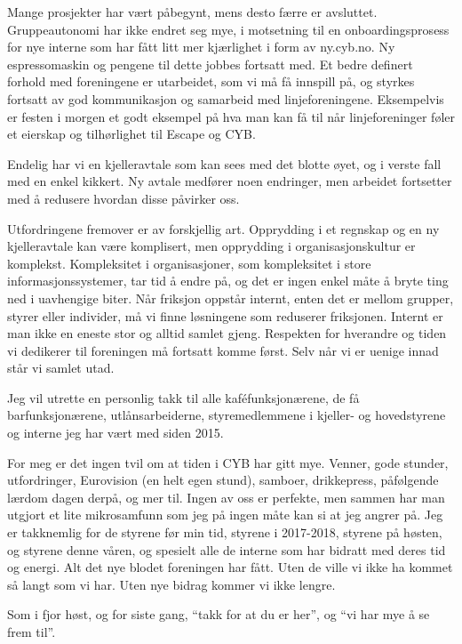 \documentclass[10pt,norsk,a4paper]{article}
\begin{document}
\begin{multicols}{2}
Mange prosjekter har vært påbegynt, mens desto færre er avsluttet.
Gruppeautonomi har ikke endret seg mye, i motsetning til en
onboardingsprosess for nye interne som har fått litt mer kjærlighet i
form av ny.cyb.no. Ny espressomaskin og pengene til dette jobbes
fortsatt med. Et bedre definert forhold med foreningene er utarbeidet,
som vi må få innspill på, og styrkes fortsatt av god kommunikasjon og
samarbeid med linjeforeningene. Eksempelvis er festen i morgen et godt
eksempel på hva man kan få til når linjeforeninger føler et eierskap og
tilhørlighet til Escape og CYB.

Endelig har vi en kjelleravtale som kan sees med det blotte øyet, og i
verste fall med en enkel kikkert. Ny avtale medfører noen endringer, men
arbeidet fortsetter med å redusere hvordan disse påvirker oss.


Utfordringene fremover er av forskjellig art. Opprydding i et regnskap
og en ny kjelleravtale kan være komplisert, men opprydding i
organisasjonskultur er komplekst. Kompleksitet i organisasjoner, som
kompleksitet i store informasjonssystemer, tar tid å endre på, og det er
ingen enkel måte å bryte ting ned i uavhengige biter. Når friksjon
oppstår internt, enten det er mellom grupper, styrer eller individer, må
vi finne løsningene som reduserer friksjonen. Internt er man ikke en
eneste stor og alltid samlet gjeng. Respekten for hverandre og tiden vi
dedikerer til foreningen må fortsatt komme først. Selv når vi er uenige
innad står vi samlet utad.

Jeg vil utrette en personlig takk til alle kaféfunksjonærene, de få
barfunksjonærene, utlånsarbeiderne, styremedlemmene i kjeller- og
hovedstyrene og interne jeg har vært med siden 2015.

For meg er det ingen tvil om at tiden i CYB har gitt mye. Venner, gode
stunder, utfordringer, Eurovision (en helt egen stund), samboer,
drikkepress, påfølgende lærdom dagen derpå, og mer til. Ingen av oss er
perfekte, men sammen har man utgjort et lite mikrosamfunn som jeg på
ingen måte kan si at jeg angrer på. Jeg er takknemlig for de styrene før
min tid, styrene i 2017-2018, styrene på høsten, og styrene denne våren,
og spesielt alle de interne som har bidratt med deres tid og energi. Alt
det nye blodet foreningen har fått. Uten de ville vi ikke ha kommet så
langt som vi har. Uten nye bidrag kommer vi ikke lengre.
\end{multicols}

Som i fjor høst, og for siste gang, ``takk for at du er her'', og ``vi
har mye å se frem til''.
\end{document}
